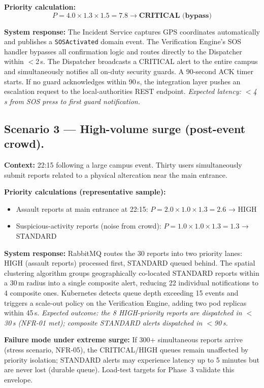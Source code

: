 \documentclass[12pt,a4paper]{article}
\begin{document}
\textbf{Priority calculation:}
\[
P = 4.0 \times 1.3 \times 1.5 = \mathbf{7.8 \rightarrow \text{CRITICAL (bypass)}}
\]

\textbf{System response:}
The Incident Service captures GPS coordinates automatically and
publishes a \texttt{SOSActivated} domain event. The Verification
Engine's SOS handler bypasses all confirmation logic and routes
directly to the Dispatcher within $<$2\,s. The Dispatcher broadcasts
a CRITICAL alert to the entire campus and simultaneously notifies
all on-duty security guards. A 90-second ACK timer starts. If no
guard acknowledges within 90\,s, the integration layer pushes an
escalation request to the local-authorities REST endpoint.
\emph{Expected latency: $<$4\,s from SOS press to first guard notification.}

\subsection{Scenario 3 --- High-volume surge (post-event crowd).}
\textbf{Context:} 22:15 following a large campus event. Thirty users
simultaneously submit reports related to a physical altercation near
the main entrance.

\textbf{Priority calculations (representative sample):}
\begin{itemize}
\item Assault reports at main entrance at 22:15:
  $P = 2.0 \times 1.0 \times 1.3 = 2.6$ → HIGH
\item Suspicious-activity reports (noise from crowd):
  $P = 1.0 \times 1.0 \times 1.3 = 1.3$ → STANDARD
\end{itemize}

\textbf{System response:}
RabbitMQ routes the 30 reports into two priority lanes: HIGH (assault
reports) processed first, STANDARD queued behind. The spatial
clustering algorithm groups geographically co-located STANDARD reports
within a 30\,m radius into a single composite alert, reducing 22
individual notifications to 4 composite ones. Kubernetes detects
queue depth exceeding 15 events and triggers a scale-out policy on
the Verification Engine, adding two pod replicas within 45\,s.
\emph{Expected outcome: the 8 HIGH-priority reports are dispatched in
$<$30\,s (NFR-01 met); composite STANDARD alerts dispatched in
$<$90\,s.}

\textbf{Failure mode under extreme surge:} If 300+ simultaneous
reports arrive (stress scenario, NFR-05), the CRITICAL/HIGH queues
remain unaffected by priority isolation; STANDARD alerts may
experience latency up to 5 minutes but are never lost (durable queue).
Load-test targets for Phase~3 validate this envelope.
\end{document}
